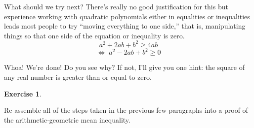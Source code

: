 \documentclass[10pt,]{book}
\theoremstyle{plain}
\theoremstyle{definition}
\theoremstyle{definition}
\newtheorem{exercise}[theorem]{Exercise}
\numberwithin{equation}{section}
\begin{document}
    What should we try next? There's really no good justification for
    this but experience working with quadratic polynomials either in
    equalities or inequalities leads most people to try ``moving everything
    to one side,'' that is, manipulating things so that one side of the
    equation or inequality is zero.
    \begin{equation*}
      a^2+2ab+b^2 \geq 4ab
    \end{equation*}
    \begin{equation*}
      \iff \; a^2-2ab+b^2 \geq 0
    \end{equation*}
\par

    Whoa! We're done! Do you see why? If not, I'll give you one
    hint: the square of any real number is greater than or equal to
    zero.
\begin{exercise}\label{exercise-19}

        Re-assemble all of the steps taken in the previous few paragraphs
        into a proof of the arithmetic-geometric mean inequality.
\end{exercise}
\typeout{************************************************}
\typeout{************************************************}
\end{document}
